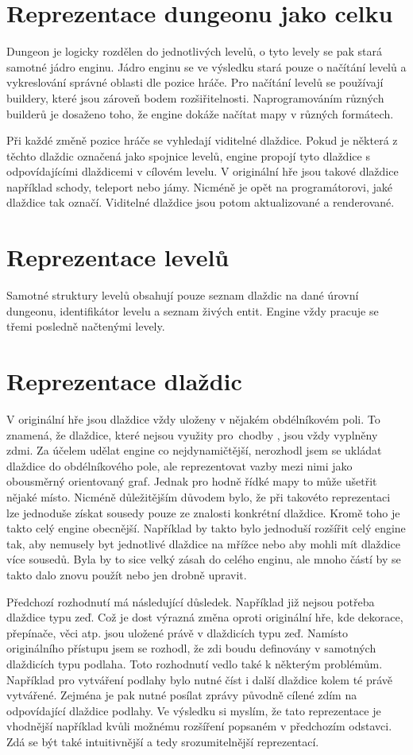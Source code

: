 \section{Reprezentace dungeonu jako celku}
Dungeon je logicky rozdělen do jednotlivých levelů, o tyto levely se pak stará samotné jádro enginu. Jádro enginu se ve výsledku stará
pouze o načítání levelů a vykreslování správné oblasti dle pozice hráče. Pro načítání levelů se používají buildery, které jsou zároveň
bodem rozšiřitelnosti. Naprogramováním různých builderů je dosaženo toho, že engine dokáže načítat mapy v různých formátech.

Při každé změně pozice hráče se vyhledají viditelné dlaždice. Pokud je některá z těchto dlaždic označená jako spojnice levelů,
engine propojí tyto dlaždice s odpovídajícími dlaždicemi v cílovém levelu. V originální hře jsou takové dlaždice například schody,
teleport nebo jámy. Nicméně je opět na programátorovi, jaké dlaždice tak označí. Viditelné dlaždice jsou potom aktualizované a renderované.

\section{Reprezentace levelů}
Samotné struktury levelů obsahují pouze seznam dlaždic na dané úrovní dungeonu, identifikátor levelu a seznam živých entit. 
Engine vždy pracuje se třemi posledně načtenými levely.

\section{Reprezentace dlaždic} 
V originální hře jsou dlaždice vždy uloženy v nějakém obdélníkovém poli. To znamená, že dlaždice, které nejsou využity pro~chodby
, jsou vždy vyplněny zdmi. Za účelem udělat engine co nejdynamičtější, nerozhodl jsem se ukládat dlaždice
do obdélníkového pole, ale reprezentovat vazby mezi nimi jako obousměrný orientovaný graf. Jednak pro hodně řídké mapy to může
ušetřit nějaké místo. Nicméně důležitějším důvodem bylo, že při takovéto reprezentaci lze jednoduše získat sousedy pouze
ze znalosti konkrétní dlaždice. Kromě toho je takto celý engine obecnější. Například by takto bylo jednoduší rozšířit celý engine
tak, aby nemusely byt jednotlivé dlaždice na mřížce nebo aby mohli mít dlaždice více sousedů. Byla by to sice velký zásah do celého 
enginu, ale mnoho částí by se takto dalo znovu použít nebo jen drobně upravit.

Předchozí rozhodnutí má následující důsledek. Například již nejsou potřeba dlaždice typu zeď.
Což je dost výrazná změna oproti originální hře, kde dekorace, přepínače, věci atp. jsou uložené právě v dlaždicích typu zeď.
Namísto originálního přístupu jsem se rozhodl, že zdi boudu definovány v samotných dlaždicích typu podlaha. Toto rozhodnutí vedlo také
k některým problémům. Například pro vytváření podlahy bylo nutné číst i další dlaždice kolem té právě vytvářené. Zejména je pak nutné 
posílat zprávy původně cílené zdím na odpovídající dlaždice podlahy. Ve výsledku si myslím, že tato reprezentace je vhodnější
například kvůli možnému rozšíření popsaném v předchozím odstavci. Zdá se být také intuitivnější a tedy srozumitelnější reprezentací.

